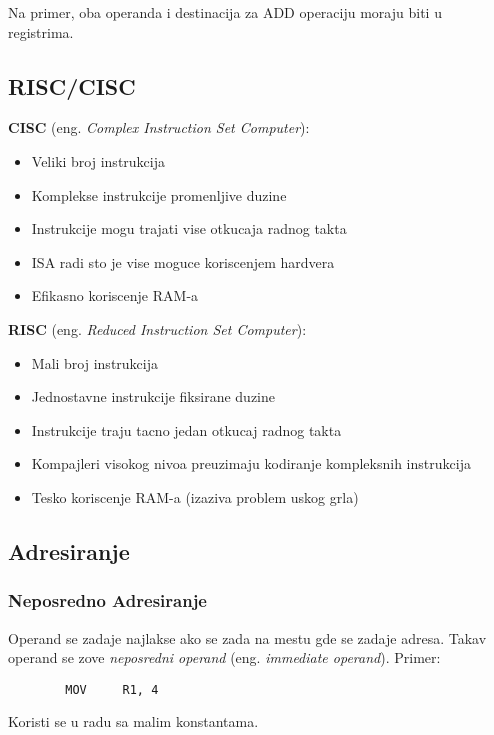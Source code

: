 \documentclass[12p,a4paper]{article}
\begin{document}
\begin{multicols}{2}
    Na primer, oba operanda i destinacija za ADD operaciju moraju biti u 
    registrima.
    
    \subsection{RISC/CISC}

    \textbf{CISC} (eng. \emph{Complex Instruction Set Computer}):
    \begin{itemize}
        \itemsep0em
        \item Veliki broj instrukcija
        \item Komplekse instrukcije promenljive duzine
        \item Instrukcije mogu trajati vise otkucaja radnog takta
        \item ISA radi sto je vise moguce koriscenjem hardvera
        \item Efikasno koriscenje RAM-a
    \end{itemize}

    \textbf{RISC} (eng. \emph{Reduced Instruction Set Computer}):
    \begin{itemize}
        \itemsep0em
        \item Mali broj instrukcija
        \item Jednostavne instrukcije fiksirane duzine
        \item Instrukcije traju tacno jedan otkucaj radnog takta
        \item Kompajleri visokog nivoa preuzimaju kodiranje kompleksnih 
            instrukcija
        \item Tesko koriscenje RAM-a (izaziva problem uskog grla)
    \end{itemize}

    \subsection{Adresiranje}

    \subsubsection{Neposredno Adresiranje}

    Operand se zadaje najlakse ako se zada na mestu gde se zadaje adresa.
    Takav operand se zove \emph{neposredni operand}
    (eng. \emph{immediate operand}). 
    Primer:
    \begin{lstlisting}
        MOV     R1, 4
    \end{lstlisting}
    Koristi se u radu sa malim konstantama.


\end{multicols}
\end{document}
